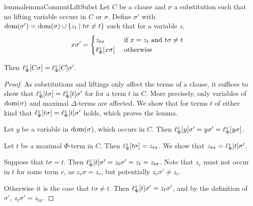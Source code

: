 \begin{restatable}{lemma}{lemmaCommutLiftSubst}
	\label{lemma:lif}
	Let $C$ be a clause and $\sigma$ a substitution such that no lifting variable occurs in $C$ or $\sigma$.
	Define $\sigma'$ with $\operatorname{dom}(\sigma') = \operatorname{dom}(\sigma) \cup \{ z_t \mid t\sigma \neq t \}$ such that for a variable $z$, 
	\[
		x \sigma' =
		\begin{cases} 
			z_{t\sigma} & \text{ if } x = z_t \text{ and } t\sigma \neq t \\
			\ell_{\Phi}^{z}[x\sigma] & \text{ otherwise}
		\end{cases} 
	\]

	Then
	$\ell_{\Phi}^{z}[C\sigma] =
	\ell_{\Phi}^{z}[C]\sigma'$.
\end{restatable}
\begin{proof}
	As substitutions and liftings only affect the terms of a clause, it suffices to  show that 
	$\ell_{\Phi}^{z}[t\sigma] = \ell_{\Phi}^{z}[t]\sigma'$ for for a term $t$ in $C$.
	More precisely, only variables of $\operatorname{dom}(\sigma)$ and maximal $\Delta$-terms are affected. 
	We show that for terms $t$ of either kind that
	$ \ell_{\Phi}^{z}[ t \sigma ] = \ell_{\Phi}^{z}[ t ] \sigma'$ holds, which proves the lemma.

	Let $y$ be a variable in $\operatorname{dom}(\sigma)$, which occurs in $C$. Then $\ell_{\Phi}^{z}[y]\sigma' = y\sigma' = \ell_{\Phi}^{z}[y\sigma]$.

	Let $t$ be a maximal $\Phi$-term in $C$.
	Then $\ell_{\Phi}^{z}[ t\sigma] = z_{t\sigma}$.
	We show that $z_{t\sigma} = \ell_{\Phi}^{z}[t]\sigma'$.

	Suppose that $t\sigma = t$. Then $\ell_{\Phi}^{z}[t]\sigma' = z_t\sigma' = z_t = z_{t\sigma}$.
	Note that $z_r$ must not occur in $t$ for some term $r$, as $z_r\sigma = z_r$, but potentially $z_r\sigma' \neq z_r$.

	Otherwise it is the case that $t\sigma \neq t$.
	Then $\ell_{\Phi}^{z}[t]\sigma' = z_t\sigma'$, and by the definition of $\sigma'$, $z_t\sigma' = z_{t\sigma}$.
\end{proof}




